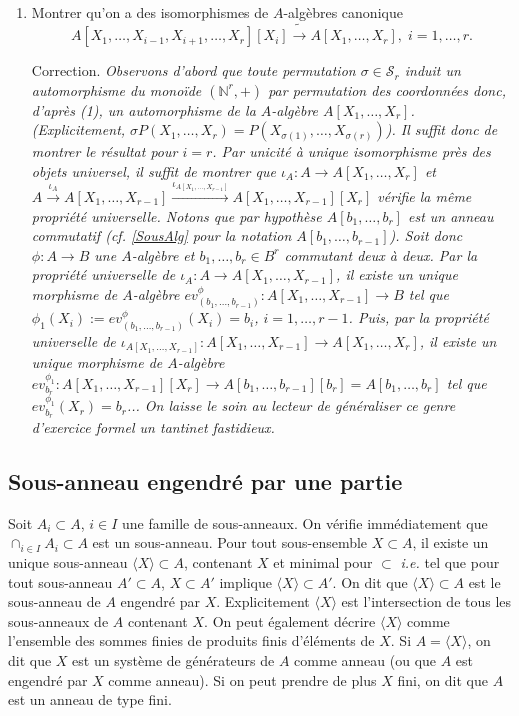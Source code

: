 \documentclass[a4paper, 12pt]{amsart}
\newcommand{\N}{\mathbb{N}}
\begin{document}
\begin{enumerate}[leftmargin=* ,parsep=0cm,itemsep=0cm,topsep=0cm]
\item Montrer qu'on a des isomorphismes de $A$-algèbres canonique $$  A[X_1,\dots,X_{i-1},X_{i+1},\dots, X_r][X_i]\tilde{\rightarrow} A[X_1,\dots,X_r],\; i=1,\dots, r.$$

   Correction. \textit{Observons d'abord que toute permutation $\sigma\in \mathcal{S}_r$ induit un automorphisme du monoïde $(\N^r,+)$ par permutation des coordonnées donc, d'après (1), un automorphisme de la $A$-algèbre $A[X_1,\dots, X_r]$. (Explicitement, $\sigma P(X_1,\dots, X_r)=P(X_{\sigma(1)},\dots, X_{\sigma(r)})$). Il suffit donc de montrer le résultat pour $i=r$. Par unicité  à unique isomorphisme près des objets universel, il suffit de montrer que 
$\iota_A:A\rightarrow A[X_1,\dots, X_r]$ et $A\stackrel{\iota_A}{\rightarrow} A[X_1,\dots, X_{r-1}]\stackrel{\iota_{A[X_1,\dots, X_{r-1}]}}{\rightarrow} A[X_1,\dots, X_{r-1}][X_r]$ vérifie la même propriété universelle. Notons que par hypothèse  $A[b_1,\dots ,b_r]$ est un anneau commutatif (\textit{cf.} \ref{SousAlg} pour la notation $A[b_1,\dots, b_{r-1}]$). Soit donc $\phi:A\rightarrow B$ une $A$-algèbre et $b_1,\dots, b_r\in B^r$ commutant deux à deux. Par la propriété universelle de $\iota_A:A\rightarrow A[X_1,\dots, X_{r-1}]$, il existe un unique morphisme de $A$-algèbre $ev_{(b_1,\dots, b_{r-1})}^\phi:A[X_1,\dots,X_{r-1}]\rightarrow B$ tel que $\phi_1(X_i):=ev_{(b_1,\dots, b_{r-1})}^\phi(X_i)=b_i$, $i=1,\dots, r-1$. Puis, par la propriété universelle de $\iota_{A[X_1,\dots, X_{r-1}]}:A[X_1,\dots, X_{r-1}]\rightarrow A[X_1,\dots, X_r]$, il existe un unique morphisme de $A$-algèbre $ev_{b_r}^{\phi_1}:A[X_1,\dots,X_{r-1}][X_r]\rightarrow A[b_1,\dots ,b_{r-1}][b_r]=A[b_1,\dots,b_r]$ tel que $ev_{b_r}^{\phi_1}(X_r)=b_r$... On laisse le soin au lecteur de généraliser ce genre d'exercice formel un tantinet fastidieux.} \\
 
  \end{enumerate}
 
 

 
  \subsection{Sous-anneau engendré par une partie} Soit  $A_i\subset A$, $i\in I$ une famille de sous-anneaux. On vérifie immédiatement que $\cap_{i\in I}A_i\subset A$ est un sous-anneau. Pour tout sous-ensemble $X\subset A$, il existe 
un unique sous-anneau $\langle X\rangle \subset A$, contenant $X$ et minimal pour $\subset$ \textit{i.e.} tel que pour  tout sous-anneau $A'\subset A$,   $X\subset A'$ implique  $\langle X\rangle\subset A'$. On dit que $\langle X\rangle\subset A$ est le sous-anneau de $A$ engendré par $X$.  Explicitement $\langle X\rangle$ est l'intersection de tous les sous-anneaux de $A$ contenant $X$. On peut également décrire $\langle X\rangle$ comme  l'ensemble des sommes finies de produits finis d'éléments de $X$. Si $A=\langle X\rangle$, on dit que $X$ est un système de générateurs de $A$ comme anneau (ou que $A$ est engendré par $X$ comme anneau). Si on peut prendre de plus $X$ fini, on dit que $A$ est un anneau de type fini.\\
\end{document}
